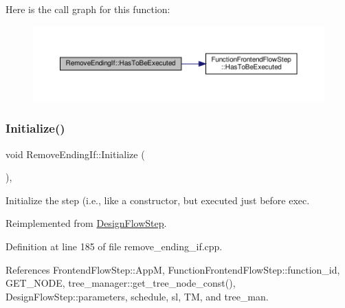 Here is the call graph for this function\+:
\nopagebreak
\begin{figure}[H]
\begin{center}
\leavevmode
\includegraphics[width=350pt]{d3/d05/classRemoveEndingIf_a02a434d8972c1582197d7e12f136c652_cgraph}
\end{center}
\end{figure}
\mbox{\label{classRemoveEndingIf_a31a37f3146c2637dfe6ea70d51269574}} 
\subsubsection{\texorpdfstring{Initialize()}{Initialize()}}
{\footnotesize\ttfamily void Remove\+Ending\+If\+::\+Initialize (\begin{DoxyParamCaption}{ }\end{DoxyParamCaption})\hspace{0.3cm}{\ttfamily [override]}, {\ttfamily [virtual]}}



Initialize the step (i.\+e., like a constructor, but executed just before exec. 



Reimplemented from \hyperlink{classDesignFlowStep_a44b50683382a094976e1d432a7784799}{Design\+Flow\+Step}.



Definition at line 185 of file remove\+\_\+ending\+\_\+if.\+cpp.



References Frontend\+Flow\+Step\+::\+AppM, Function\+Frontend\+Flow\+Step\+::function\+\_\+id, G\+E\+T\+\_\+\+N\+O\+DE, tree\+\_\+manager\+::get\+\_\+tree\+\_\+node\+\_\+const(), Design\+Flow\+Step\+::parameters, schedule, sl, TM, and tree\+\_\+man.

